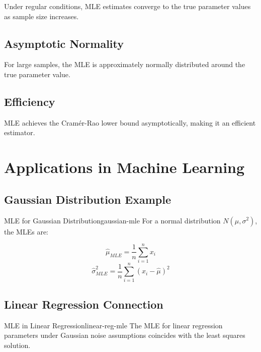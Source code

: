 \documentclass[
  12 pt,
  a4paper,
]{book}
\numberwithin{equation}{section}
\theoremstyle{plain}      %
\theoremstyle{definition} %
\theoremstyle{remark}     %
\theoremstyle{note}         %
\begin{document}
Under regular conditions, MLE estimates converge to the true parameter
values as sample size increases.

\hypertarget{asymptotic-normality}{%
\subsection{Asymptotic Normality}\label{asymptotic-normality}}

For large samples, the MLE is approximately normally distributed around
the true parameter value.

\hypertarget{efficiency}{%
\subsection{Efficiency}\label{efficiency}}

MLE achieves the Cramér-Rao lower bound asymptotically, making it an
efficient estimator.

\hypertarget{applications-in-machine-learning-3}{%
\section{Applications in Machine
Learning}\label{applications-in-machine-learning-3}}

\hypertarget{gaussian-distribution-example}{%
\subsection{Gaussian Distribution
Example}\label{gaussian-distribution-example}}

\begin{a_exmp}{MLE for Gaussian Distribution}{gaussian-mle}
For a normal distribution $N(\mu, \sigma^2)$, the MLEs are:

$$\hat{\mu}_{MLE} = \frac{1}{n}\sum_{i=1}^n x_i$$
$$\hat{\sigma}^2_{MLE} = \frac{1}{n}\sum_{i=1}^n (x_i - \hat{\mu})^2$$
\end{a_exmp}

\hypertarget{linear-regression-connection}{%
\subsection{Linear Regression
Connection}\label{linear-regression-connection}}

\begin{a_lemma}{MLE in Linear Regression}{linear-reg-mle}
The MLE for linear regression parameters under Gaussian noise assumptions coincides with the least squares solution.
\end{a_lemma}
\end{document}
